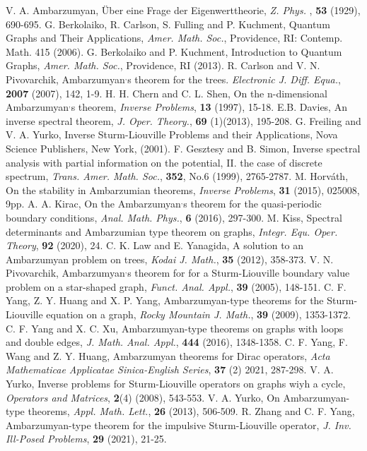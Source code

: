 \documentclass[reqno,11pt,centertags]{amsart}
\numberwithin{equation}{section}
\theoremstyle{definition}
\begin{document}
\begin{thebibliography}{99}
	 V. A. Ambarzumyan, \"{U}ber eine Frage der Eigenwerttheorie, \textit{Z. Phys. }, \textbf{53} (1929), 690-695.
 G. Berkolaiko, R. Carlson, S. Fulling and P. Kuchment, Quantum Graphs and Their Applications, \textit{Amer. Math. Soc.}, Providence, RI: Contemp. Math. 415 (2006).
 G. Berkolaiko and P. Kuchment, Introduction to Quantum Graphs, \textit{Amer. Math. Soc.}, Providence, RI (2013).
 R. Carlson and V. N. Pivovarchik, Ambarzumyan$^{\textbf{,}}$s theorem for the trees. \textit{Electronic J. Diff. Equa.}, \textbf{2007} (2007), 142, 1-9.
 H. H. Chern and C. L. Shen, On the n-dimensional Ambarzumyan$^{\textbf{,}}$s theorem, \textit{Inverse Problems}, \textbf{13} (1997),
    15-18.
 E.B. Davies, An inverse spectral theorem, \textit{J. Oper. Theory.}, \textbf{69} (1)(2013), 195-208.
 G. Freiling and V. A. Yurko, Inverse Sturm-Liouville Problems and their Applications, Nova Science Publishers, New York, (2001).
 F. Gesztesy and B. Simon, Inverse spectral analysis with partial information on the potential, II. the case of discrete spectrum,  \textit{Trans. Amer. Math. Soc.}, \textbf{352}, No.6 (1999), 2765-2787.
 M. Horv\'{a}th, On the stability in Ambarzumian theorems, \textit{Inverse Problems}, \textbf{31} (2015), 025008, 9pp.
 A. A. Kirac, On the Ambarzumyan$^{\textbf{,}}$s theorem for the quasi-periodic boundary conditions, \textit{Anal. Math. Phys.},  \textbf{6} (2016), 297-300.
 M. Kiss, Spectral determinants and Ambarzumian type theorem on graphs, \textit{Integr. Equ. Oper. Theory}, \textbf{92} (2020), 24.
 C. K. Law and E. Yanagida, A solution to an Ambarzumyan problem on trees, \textit{Kodai J. Math.}, \textbf{35} (2012), 358-373.
 V. N. Pivovarchik, Ambarzumyan$^{\textbf{,}}$s theorem for  for a Sturm-Liouville boundary value problem on a star-shaped graph, \textit{Funct. Anal. Appl.}, \textbf{39} (2005), 148-151.
 C. F. Yang, Z. Y. Huang and X. P. Yang, Ambarzumyan-type theorems for the Sturm-Liouville equation on a graph, \textit{Rocky Mountain J. Math.}, \textbf{39} (2009), 1353-1372.
 C. F. Yang and X. C. Xu, Ambarzumyan-type theorems on graphs with loops and double edges, \textit{ J. Math. Anal. Appl.}, \textbf{444} (2016), 1348-1358.
 C. F. Yang, F. Wang and Z. Y. Huang, Ambarzumyan theorems for Dirac operators,  \textit{ Acta Mathematicae Applicatae Sinica-English Series}, \textbf{37} (2) 2021, 287-298.
 V. A. Yurko, Inverse problems for Sturm-Liouville operators on graphs wiyh a cycle, \textit{Operators and Matrices}, \textbf{2}(4) (2008), 543-553.
 V. A. Yurko, On Ambarzumyan-type theorems, \textit{Appl. Math. Lett.}, \textbf{26} (2013), 506-509.
 R. Zhang and C. F. Yang, Ambarzumyan-type theorem for the impulsive Sturm-Liouville operator, \textit{J. Inv. Ill-Posed Problems}, \textbf{29} (2021), 21-25.
		
\end{thebibliography}
\end{document}
